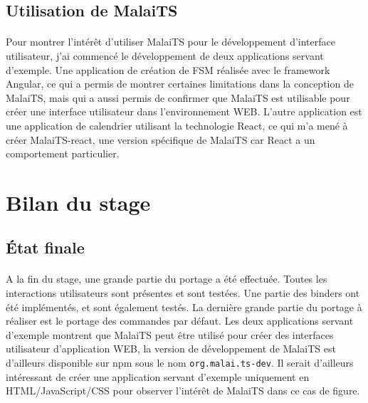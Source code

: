 \documentclass[11pt, a4paper, pdftex]{article}
\newcommand{\info}{\texttt}
\begin{document}
        \subsection{Utilisation de MalaiTS}\label{subsec:travexem}
            \paragraph{}
                Pour montrer l'intérêt d'utiliser MalaiTS pour le développement d'interface utilisateur, j'ai commencé le développement de deux applications servant d'exemple.
                Une application de création de FSM réalisée avec le framework Angular, ce qui a permis de montrer certaines limitations dans la conception de MalaiTS,
                mais qui a aussi permis de confirmer que MalaiTS est utilisable pour créer une interface utilisateur dans l'environnement WEB\@.
                L'autre application est une application de calendrier utilisant la technologie React, ce qui m'a mené à créer MalaiTS-react, une version spécifique de MalaiTS car React a un comportement particulier.

    \newpage
    \section{Bilan du stage}\label{sec:bilsta}
        \subsection{État finale}\label{subsec:etatfin}
            \paragraph{}
                A la fin du stage, une grande partie du portage a été effectuée.
                Toutes les interactions utilisateurs sont présentes et sont testées.
                Une partie des binders ont été implémentés, et sont également testés.
                La dernière grande partie du portage à réaliser est le portage des commandes par défaut.
                Les deux applications servant d'exemple montrent que MalaiTS peut être utilisé pour créer des interfaces utilisateur d'application WEB, la version de développement de MalaiTS est d'ailleurs disponible sur npm sous le nom \info{org.malai.ts-dev}.
                Il serait d'ailleurs intéressant de créer une application servant d'exemple uniquement en HTML/JavaScript/CSS pour observer l'intérêt de MalaiTS dans ce cas de figure.
\end{document}
